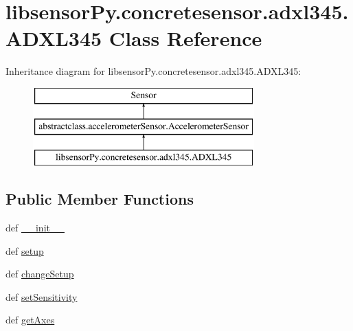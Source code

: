 \hypertarget{classlibsensorPy_1_1concretesensor_1_1adxl345_1_1ADXL345}{}\section{libsensor\+Py.\+concretesensor.\+adxl345.\+A\+D\+X\+L345 Class Reference}
\label{classlibsensorPy_1_1concretesensor_1_1adxl345_1_1ADXL345}
Inheritance diagram for libsensor\+Py.\+concretesensor.\+adxl345.\+A\+D\+X\+L345\+:\begin{figure}[H]
\begin{center}
\leavevmode
\includegraphics[height=3.000000cm]{classlibsensorPy_1_1concretesensor_1_1adxl345_1_1ADXL345}
\end{center}
\end{figure}
\subsection*{Public Member Functions}
\begin{DoxyCompactItemize}
\item 
def \hyperlink{classlibsensorPy_1_1concretesensor_1_1adxl345_1_1ADXL345_acf4266e62065aed0b43a5292aef75f96}{\+\_\+\+\_\+init\+\_\+\+\_\+}
\item 
def \hyperlink{classlibsensorPy_1_1concretesensor_1_1adxl345_1_1ADXL345_a4cb02a2e49ab39364881482aa20ba1aa}{setup}
\item 
def \hyperlink{classlibsensorPy_1_1concretesensor_1_1adxl345_1_1ADXL345_a9751eb0ddbb665e05f6e73d7fc7a36ec}{change\+Setup}
\item 
def \hyperlink{classlibsensorPy_1_1concretesensor_1_1adxl345_1_1ADXL345_a0c0ebfc27505c0d08719b83f2b34e402}{set\+Sensitivity}
\item 
def \hyperlink{classlibsensorPy_1_1concretesensor_1_1adxl345_1_1ADXL345_ad0ca5c3235db81b5b538e9c494408067}{get\+Axes}
\end{DoxyCompactItemize}

